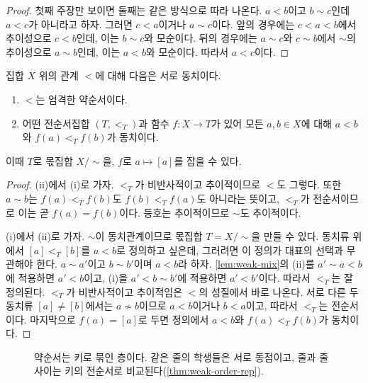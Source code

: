 \begin{proof}
첫째 주장만 보이면 둘째는 같은 방식으로 따라 나온다. $a<b$이고 $b\sim c$인데 $a<c$가 아니라고 하자. 그러면 $c<a$이거나 $a\sim c$이다. 앞의 경우에는 $c<a<b$에서 추이성으로 $c<b$인데, 이는 $b\sim c$와 모순이다. 뒤의 경우에는 $a\sim c$와 $c\sim b$에서 $\sim$의 추이성으로 $a\sim b$인데, 이는 $a<b$와 모순이다. 따라서 $a<c$이다.
\end{proof}

\begin{theorem}[약순서의 표현]
\label{thm:weak-order-rep}
집합 $X$ 위의 관계 $<$에 대해 다음은 서로 동치이다.
\begin{enumerate}
\item $<$는 엄격한 약순서이다.
\item 어떤 전순서집합 $(T,<_T)$과 함수 $f:X\to T$가 있어 모든 $a,b\in X$에 대해 $a<b$와 $f(a)<_T f(b)$가 동치이다.
\end{enumerate}
이때 $T$로 몫집합 $X/{\sim}$을, $f$로 $a\mapsto[a]$를 잡을 수 있다.
\end{theorem}

\begin{proof}
(ii)에서 (i)로 가자. $<_T$가 비반사적이고 추이적이므로 $<$도 그렇다. 또한 $a\sim b$는 $f(a)<_T f(b)$도 $f(b)<_T f(a)$도 아니라는 뜻이고, $<_T$가 전순서이므로 이는 곧 $f(a)=f(b)$이다. 등호는 추이적이므로 $\sim$도 추이적이다.

(i)에서 (ii)로 가자. $\sim$이 동치관계이므로 몫집합 $T=X/{\sim}$을 만들 수 있다. 동치류 위에서 $[a]<_T[b]$를 $a<b$로 정의하고 싶은데, 그러려면 이 정의가 대표의 선택과 무관해야 한다. $a\sim a'$이고 $b\sim b'$이며 $a<b$라 하자. \cref{lem:weak-mix}의 (ii)를 $a'\sim a<b$에 적용하면 $a'<b$이고, (i)을 $a'<b\sim b'$에 적용하면 $a'<b'$이다. 따라서 $<_T$는 잘 정의된다. $<_T$가 비반사적이고 추이적임은 $<$의 성질에서 바로 나온다. 서로 다른 두 동치류 $[a]\ne[b]$에서는 $a\not\sim b$이므로 $a<b$이거나 $b<a$이고, 따라서 $<_T$는 전순서이다. 마지막으로 $f(a)=[a]$로 두면 정의에서 $a<b$와 $f(a)<_T f(b)$가 동치이다.
\end{proof}

\begin{figure}[htbp]
\centering
{}
\caption{약순서는 키로 묶인 층이다. 같은 줄의 학생들은 서로 동점이고, 줄과 줄 사이는 키의 전순서로 비교된다(\cref{thm:weak-order-rep}).}
\label{fig:weak-layers}
\end{figure}

